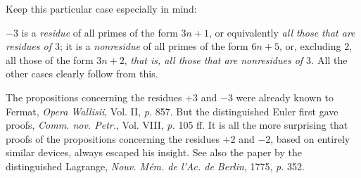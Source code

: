 Keep this particular case especially in mind:

$-3$ is a \emph{residue} of all primes of the form $3n+1$, or equivalently \emph{all those that are residues of $3$}; it is a \emph{nonresidue} of all primes of the form $6n+5$, or, excluding $2$, all those of the form $3n+2$, \emph{that is, all those that are nonresidues of $3$.} All the other cases clearly follow from this.

The propositions concerning the residues $+3$ and $-3$ were already known to Fermat, \emph{Opera Wallisii}, Vol. II, \emph{p.} 857. But the distinguished Euler first gave proofs, \emph{Comm. nov. Petr.}, Vol. VIII, \emph{p.} 105 ff. It is all the more surprising that proofs of the propositions concerning the residues $+2$ and $-2$, based on entirely similar devices, always escaped his insight. See also the paper by the distinguished Lagrange, \emph{Nouv. M\'em. de l'Ac. de Berlin}, 1775, \emph{p.} 352.
